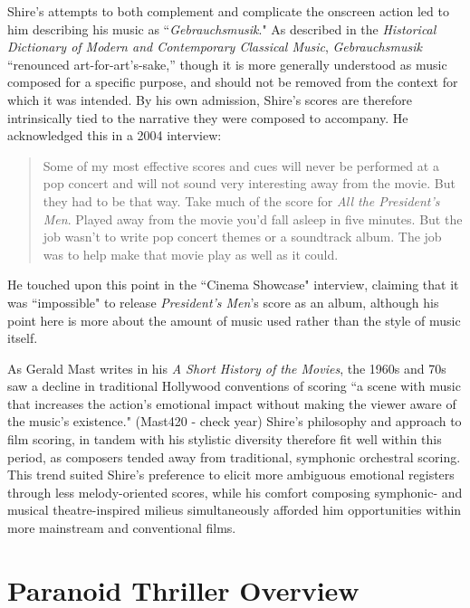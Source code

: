 Shire's attempts to both complement and complicate the onscreen action led to him describing his music as ``\textit{Gebrauchsmusik}."\autocites[][23-24]{chattah_david_2015}
As described in the \textit{Historical Dictionary of Modern and Contemporary Classical Music}, \textit{Gebrauchsmusik} ``renounced art-for-art’s-sake,” though it is more generally understood as music composed for a specific purpose, and should not be removed from the context for which it was intended.\autocites[][]{gagne_historical_2012}
By his own admission, Shire's scores are therefore intrinsically tied to the narrative they were composed to accompany.
He acknowledged this in a 2004 interview:
\begin{quote}
Some of my most effective scores and cues will never be performed at a pop concert and will not sound very interesting away from the movie. But they had to be that way. Take much of the score for \textit{All the President's Men}. Played away from the movie you'd fall asleep in five minutes. But the job wasn't to write pop concert themes or a soundtrack album. The job was to help make that movie play as well as it could.\autocites[][15]{armstrong_high_2004}
\end{quote}
He touched upon this point in the ``Cinema Showcase" interview, claiming that it was ``impossible" to release \textit{President's Men}'s score as an album, although his point here is more about the amount of music used rather than the style of music itself.\autocites[][]{schwartz_cinema_1976}


As Gerald Mast writes in his \textit{A Short History of the Movies}, the 1960s and 70s saw a decline in traditional Hollywood conventions of scoring ``a scene with music that increases the action's emotional impact without making the viewer aware of the music's existence." (Mast420 - check year)
Shire's philosophy and approach to film scoring, in tandem with his stylistic diversity therefore fit well within this period, as composers tended away from traditional, symphonic orchestral scoring.
This trend suited Shire's preference to elicit more ambiguous emotional registers through less melody-oriented scores, while his comfort composing symphonic- and musical theatre-inspired milieus simultaneously afforded him opportunities within more mainstream and conventional films.





\section{Paranoid Thriller Overview}

